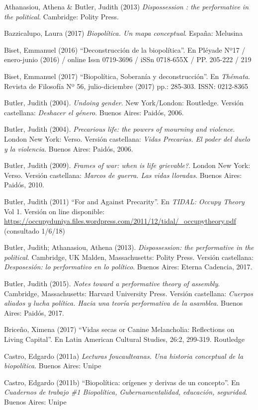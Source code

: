 \documentclass[a4paper,]{scrartcl}
\begin{document}
Athanasiou, Athena \& Butler, Judith (2013) \emph{Dispossession : the
performative in the political}. Cambridge: Polity Press.

Bazzicalupo, Laura (2017) \emph{Biopolítica. Un mapa conceptual}.
España: Melusina

Biset, Emmanuel (2016) ``Deconstrucción de la biopolítica''. En Pléyade
Nº17 / enero-junio (2016) / online Issn 0719-3696 / iSSn 0718-655X / PP.
205-222 / 219

Biset, Emmanuel (2017) ``Biopolítica, Soberanía y deconstrucción''. En
\emph{Thémata}. Revista de Filosofía Nº 56, julio-diciembre (2017) pp.:
285-303. ISSN: 0212-8365

Butler, Judith (2004). \emph{Undoing gender}. New York/London:
Routledge. Versión castellana: \emph{Deshacer el género}. Buenos Aires:
Paidós, 2006.

Butler, Judith (2004). \emph{Precarious life: the powers of mourning and
violence}. London New York: Verso. Versión castellana: \emph{Vidas
Precarias. El poder del duelo y la violencia}. Buenos Aires: Paidós,
2006.

Butler, Judith (2009). \emph{Frames of war: when is life grievable?}.
London New York: Verso. Versión castellana: \emph{Marcos de guerra. Las
vidas lloradas}. Buenos Aires: Paidós, 2010.

Butler, Judith (2011) ``For and Against Precarity''. En \emph{TIDAL:
Occupy Theory} Vol 1. Versión on line disponible:
\url{https://occupyduniya.files.wordpress.com/2011/12/tidal/_occupytheory.pdf}
(consultado 1/6/18)

Butler, Judith; Athanasiou, Athena (2013). \emph{Dispossession: the
performative in the political}. Cambridge, UK Malden, Massachusetts:
Polity Press. Versión castellana: \emph{Desposesión: lo performativo en
lo político}. Buenos Aires: Eterna Cadencia, 2017.

Butler, Judith (2015). \emph{Notes toward a performative theory of
assembly}. Cambridge, Massachusetts: Harvard University Press. Versión
castellana: \emph{Cuerpos aliados y lucha política. Hacia una teoría
performativa de la asamblea}. Buenos Aires: Paidós, 2017.

Briceño, Ximena (2017) ``Vidas secas or Canine Melancholia: Reflections
on Living Capital''. En Latin American Cultural Studies, 26:2, 299-319.
Routledge

Castro, Edgardo (2011a) \emph{Lecturas foucaulteanas. Una historia
conceptual de la biopolítica}. Buenos Aires: Unipe

Castro, Edgardo (2011b) ``Biopolítica: orígenes y derivas de un
concepto''. En \emph{Cuadernos de trabajo \#1 Biopolítica,
Gubernamentalidad, educación, seguridad}. Buenos Aires: Unipe
\end{document}
